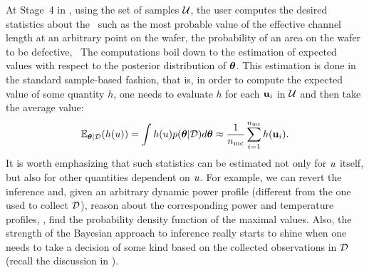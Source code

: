 At Stage~4 in , using the set of samples $\mathcal{U}$, the user computes the desired statistics about the \qoi\ such as the most probable value of the effective channel length at an arbitrary point on the wafer, the probability of an area on the wafer to be defective, \etc\ The computations boil down to the estimation of expected values with respect to the posterior distribution of ${\boldsymbol\theta}$. This estimation is done in the standard sample-based fashion, that is, in order to compute the expected value of some quantity $h$, one needs to evaluate $h$ for each $\mathbf{u}_i$ in $\mathcal{U}$ and then take the average value:
\[
  \E_{\vparam | \Data}(h(\u)) = \int h(\u) \f{\vparam | \Data} d\vparam \approx \frac{1}{\nsamples} \sum_{i = 1}^\nsamples h(\vu_i).
\]
It is worth emphasizing that such statistics can be estimated not only for $u$ itself, but also for other quantities dependent on $u$.
For example, we can revert the inference and, given an arbitrary dynamic power profile (different from the one used to collect $\mathcal{D}$), reason about the corresponding power and temperature profiles, \eg, find the probability density function of the maximal values.
Also, the strength of the Bayesian approach to inference really starts to shine when one needs to take a decision of some kind based on the collected observations in $\mathcal{D}$ (recall the discussion in ).
